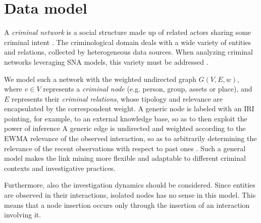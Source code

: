 \section{Data model}
\label{sec:data-model}

A \textit{criminal network} is a social structure made up of related actors sharing some criminal intent \cite{von2001organisierte}. 
The criminological domain deals with a wide variety of entities and relations, collected by heterogeneous data sources. 
When analyzing criminal networks leveraging SNA models, this variety must be addressed \cite{pramanik2016framework}.

We model such a network with the weighted undirected graph $G(V,E,w)$, where $v\in V$ represents a \textit{criminal node} (e.g. person, group, assets or place), and $E$ represents their \textit{criminal relations}, whose tipology and relevance are encapsulated by the correspondent weight.
A generic node is labeled with an IRI pointing, for example, to an external knowledge base, so as to then exploit the power of inference
A generic edge is undirected and weighted according to the EWMA relevance of the observed interaction, so as to arbitrarily determining the relevance of the recent observations with respect to past ones \cite{lucas1990exponentially}. 
Such a general model makes the link mining more flexible and adaptable to different criminal contexts and investigative practices.

Furthermore, also the investigation dynamics should be considered. Since entities are observed in their interactions, isolated nodes has no sense in this model. This means that a node insertion occurs only through the insertion of an interaction involving it.

